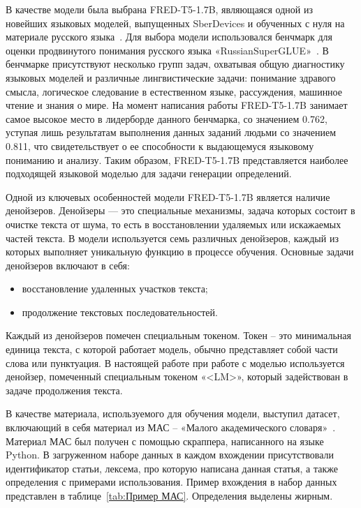 \documentclass[LI,VKR]{HSEUniversity}
\begin{document}
В качестве модели была выбрана FRED-T5-1.7B, являющаяся одной из новейших языковых моделей,
выпущенных SberDevices и обученных с нуля на материале русского языка~\cite{FRED-T5}.
Для выбора модели использовался бенчмарк для оценки продвинутого понимания русского языка
«RussianSuperGLUE»~\cite{RussianSuperGLUE}.
В бенчмарке присутствуют несколько групп задач, охватывая
общую диагностику языковых моделей и различные лингвистические задачи:
понимание здравого смысла, логическое следование в естественном языке,
рассуждения, машинное чтение и знания о мире.
На момент написания работы FRED-T5-1.7B занимает самое высокое место в лидерборде данного бенчмарка,
со значением 0.762,
уступая лишь результатам выполнения данных заданий людьми со значением 0.811,
что свидетельствует о ее способности к выдающемуся языковому пониманию и анализу.
Таким образом, FRED-T5-1.7B представляется наиболее подходящей языковой моделью
для задачи генерации определений.

Одной из ключевых особенностей модели FRED-T5-1.7B является наличие денойзеров.
Денойзеры — это специальные механизмы, задача которых состоит в очистке текста от шума,
то есть в восстановлении удаляемых или искажаемых частей текста.
В модели используется семь различных денойзеров, каждый из которых выполняет
уникальную функцию в процессе обучения.
Основные задачи денойзеров включают в себя:
\begin{itemize}
    \item восстановление удаленных участков текста;
    \item продолжение текстовых последовательностей.
\end{itemize}

Каждый из денойзеров помечен специальным токеном.
Токен – это минимальная единица текста, с которой работает модель,
обычно представляет собой части слова или пунктуация.
В настоящей работе при работе с моделью используется денойзер,
помеченный специальным токеном «<LM>»,
который задействован в задаче продолжения текста.

В качестве материала, используемого для обучения модели, выступил датасет,
включающий в себя материал из МАС – «Малого академического словаря»~\cite{MAS1981}.
Материал МАС был получен с помощью скраппера, написанного на языке Python.
В загруженном наборе данных в каждом вхождении присутствовали
идентификатор статьи, лексема, про которую написана данная статья, а также определения
с примерами использования.
Пример вхождения в набор данных представлен в таблице~\ref{tab:Пример МАС}.
Определения выделены жирным.
\end{document}
